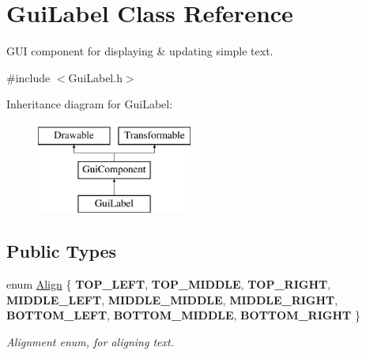\hypertarget{class_gui_label}{}\section{Gui\+Label Class Reference}
\label{class_gui_label}


G\+UI component for displaying \& updating simple text.  




{\ttfamily \#include $<$Gui\+Label.\+h$>$}

Inheritance diagram for Gui\+Label\+:\begin{figure}[H]
\begin{center}
\leavevmode
\includegraphics[height=3.000000cm]{class_gui_label}
\end{center}
\end{figure}
\subsection*{Public Types}
\begin{DoxyCompactItemize}
\item 
\mbox{\label{class_gui_label_a408cd142a14adb06d632ed44e674ddf2}} 
enum \mbox{\hyperlink{class_gui_label_a408cd142a14adb06d632ed44e674ddf2}{Align}} \{ \newline
{\bfseries T\+O\+P\+\_\+\+L\+E\+FT}, 
{\bfseries T\+O\+P\+\_\+\+M\+I\+D\+D\+LE}, 
{\bfseries T\+O\+P\+\_\+\+R\+I\+G\+HT}, 
{\bfseries M\+I\+D\+D\+L\+E\+\_\+\+L\+E\+FT}, 
\newline
{\bfseries M\+I\+D\+D\+L\+E\+\_\+\+M\+I\+D\+D\+LE}, 
{\bfseries M\+I\+D\+D\+L\+E\+\_\+\+R\+I\+G\+HT}, 
{\bfseries B\+O\+T\+T\+O\+M\+\_\+\+L\+E\+FT}, 
{\bfseries B\+O\+T\+T\+O\+M\+\_\+\+M\+I\+D\+D\+LE}, 
\newline
{\bfseries B\+O\+T\+T\+O\+M\+\_\+\+R\+I\+G\+HT}
 \}
\begin{DoxyCompactList}\small\item\em Alignment enum, for aligning text. \end{DoxyCompactList}\end{DoxyCompactItemize}
